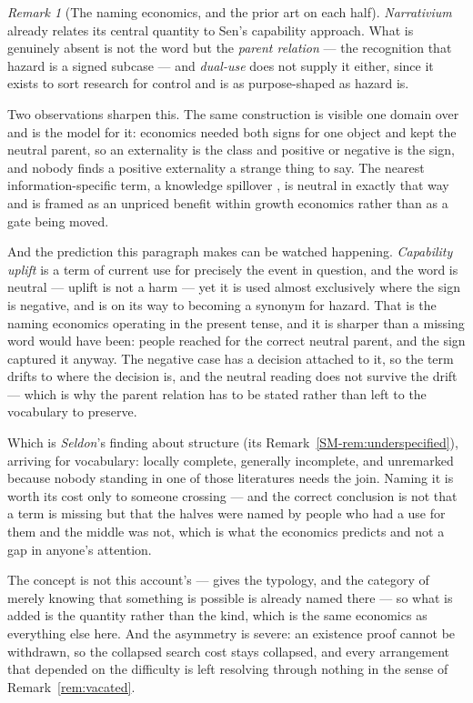 \documentclass[11pt,a4paper]{article}
\theoremstyle{remark}\newtheorem{remark}[definition]{Remark}
\begin{document}
\begin{remark}[The naming economics, and the prior art on each half]
\emph{Narrativium} already relates its central quantity to Sen's capability approach. What is
genuinely absent is not the word but the \emph{parent relation} ---
the recognition that hazard is a signed subcase --- and \emph{dual-use} does not supply it either, since
it exists to sort research for control and is as purpose-shaped as hazard is.

Two observations sharpen this. The same construction is visible one domain over and is the model for
it: economics needed both signs for one object and kept the neutral parent, so an externality is the
class and positive or negative is the sign, and nobody finds a positive externality a strange thing to
say. The nearest information-specific term, a knowledge spillover \citep{jaffe1993}, is neutral in
exactly that way and is framed as an unpriced benefit within growth economics rather than as a gate
being moved.

And the prediction this paragraph makes can be watched happening. \emph{Capability uplift} is a term of
current use for precisely the event in question, and the word is neutral --- uplift is not a harm --- yet
it is used almost exclusively where the sign is negative, and is on its way to becoming a synonym for
hazard. That is the naming economics operating in the present tense, and it is
sharper than a missing word would have been: people reached for the correct neutral parent, and the
sign captured it anyway. The negative case has a decision attached to it, so the term drifts to where
the decision is, and the neutral reading does not survive the drift --- which is why the parent relation
has to be stated rather than left to the vocabulary to preserve.

Which is \emph{Seldon}'s finding about structure (its Remark~\ref{SM-rem:underspecified}), arriving for vocabulary: locally complete,
generally incomplete, and unremarked because nobody standing in one of those literatures needs the
join. Naming it is worth its cost only to someone crossing --- and the correct conclusion is not that a
term is missing but that the halves were named by people who had a use for them and the middle was not,
which is what the economics predicts and not a gap in anyone's attention.

The concept is not this account's --- \citet{bostrom2011} gives the typology, and the
category of merely knowing that something is possible is already named there --- so what is added is the
quantity rather than the kind, which is the same economics as everything else here. And the asymmetry is
severe: an existence proof cannot be withdrawn, so the collapsed search cost stays collapsed, and every
arrangement that depended on the difficulty is left resolving through nothing in the sense of
Remark~\ref{rem:vacated}.
\end{remark}
\end{document}
